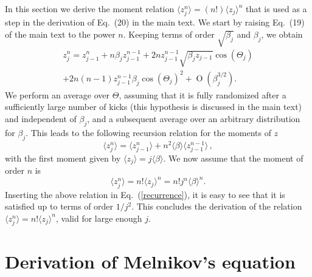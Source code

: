 \documentclass[ prl, twocolumn, superscriptaddress, amsfonts, amsmath,floatfix]{revtex4-1}
\begin{document}
In this section we derive the moment relation $\langle z_j^n \rangle = (n!) \langle z_j \rangle^n$ that is used as a step
in the derivation of Eq.~(20) in the main text. We start by raising Eq.~(19) of the main text to the power $n$. Keeping terms of order $\sqrt{\beta_j}$ and $\beta_j$, we obtain
\begin{multline}
   z_j^n=z_{j-1}^n+n\beta_jz_{j-1}^{n-1}+2nz_{j-1}^{n-1}\sqrt{\beta_jz_{j-1}}\cos(\Theta_j)
\\
      +2n(n-1)z_{j-1}^{n-1}\beta_j\cos(\Theta_j)^2+\operatorname{O}(\beta_j^{3/2}).
\end{multline}
We perform an average over $\Theta$, assuming that it is fully randomized after a sufficiently large number of kicks (this hypothesis is discussed in the main text) and independent of $\beta_j$, and a subsequent average over an arbitrary distribution for $\beta_j$. This leads to the following recursion relation for the moments of $z$
\begin{equation}\label{recurrence}
   \langle z_j^n\rangle = \langle z_{j-1}^n\rangle
      +n^2\langle\beta\rangle\langle z_{j-1}^{n-1}\rangle  \, ,
\end{equation}
with the first moment given by $\langle z_j\rangle=j\langle\beta\rangle$. We now assume that the moment of order $n$ is
\begin{equation}
   \langle z_j^n\rangle = n! \langle z_j\rangle^n = n! j^n\langle\beta\rangle^n.
\end{equation}
Inserting the above relation in Eq.~(\ref{recurrence}), it is easy to see that it is satisfied up to terms of order $1/j^2$. This concludes the derivation of the relation $\langle z_j^n\rangle = n! \langle z_j\rangle^n$, valid for large enough $j$.

\section{Derivation of Melnikov's equation}
\end{document}
